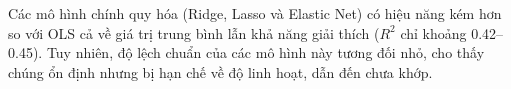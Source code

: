 Các mô hình chính quy hóa (Ridge, Lasso và Elastic Net) có hiệu năng kém hơn
so với OLS cả về giá trị trung bình lẫn khả năng giải thích ($R^2$ chỉ khoảng
0.42--0.45). Tuy nhiên, độ lệch chuẩn của các mô hình này tương đối nhỏ, cho
thấy chúng ổn định nhưng bị hạn chế về độ linh hoạt, dẫn đến chưa khớp.
